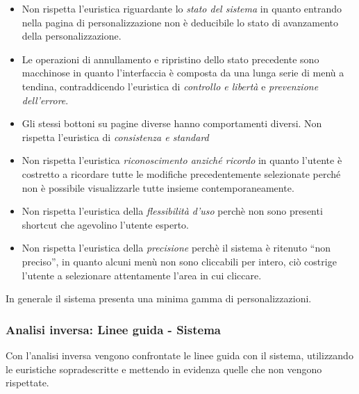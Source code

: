 \documentclass[12pt,italian,]{report}
\begin{document}
\begin{itemize}
\item
  Non rispetta l'euristica riguardante lo \emph{stato del sistema} in
  quanto entrando nella pagina di personalizzazione non è deducibile lo
  stato di avanzamento della personalizzazione.
\item
  Le operazioni di annullamento e ripristino dello stato precedente sono
  macchinose in quanto l'interfaccia è composta da una lunga serie di
  menù a tendina, contraddicendo l'euristica di \emph{controllo e
  libertà} e \emph{prevenzione dell'errore}.
\item
  Gli stessi bottoni su pagine diverse hanno comportamenti diversi. Non
  rispetta l'euristica di \emph{consistenza e standard}
\item
  Non rispetta l'euristica \emph{riconoscimento anziché ricordo} in
  quanto l'utente è costretto a ricordare tutte le modifiche
  precedentemente selezionate perché non è possibile visualizzarle tutte
  insieme contemporaneamente.
\item
  Non rispetta l'euristica della \emph{flessibilità d'uso} perchè non
  sono presenti shortcut che agevolino l'utente esperto.
\item
  Non rispetta l'euristica della \emph{precisione} perchè il sistema è
  ritenuto ``non preciso'', in quanto alcuni menù non sono cliccabili
  per intero, ciò costrige l'utente a selezionare attentamente l'area in
  cui cliccare.
\end{itemize}

In generale il sistema presenta una minima gamma di personalizzazioni.

\hypertarget{analisi-inversa-linee-guida---sistema-1}{%
\subsubsection{Analisi inversa: Linee guida -
Sistema}\label{analisi-inversa-linee-guida---sistema-1}}

Con l'analisi inversa vengono confrontate le linee guida con il sistema,
utilizzando le euristiche sopradescritte e mettendo in evidenza quelle
che non vengono rispettate.
\end{document}

